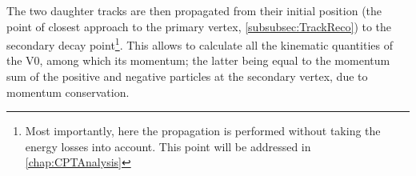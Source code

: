 
The two daughter tracks are then propagated from their initial position (the point of closest approach to the primary vertex, \Sec\ref{subsubsec:TrackReco}) to the secondary decay point\footnote{Most importantly, here the propagation is performed without taking the energy losses into account. This point will be addressed in \chap\ref{chap:CPTAnalysis}}. This allows to calculate all the kinematic quantities of the V0, among which its momentum; the latter being equal to the momentum sum of the positive and negative particles at the secondary vertex, due to momentum conservation.

